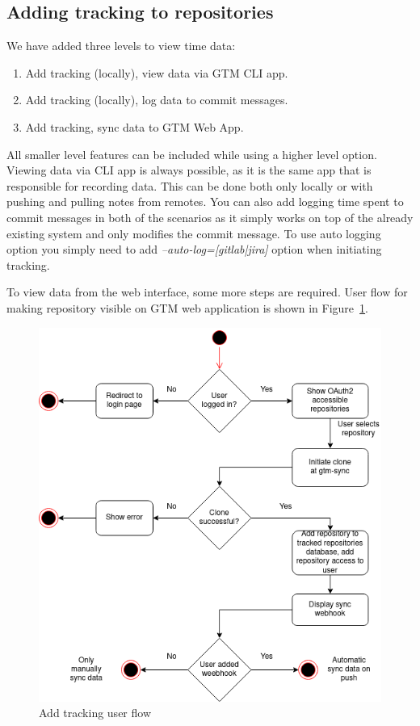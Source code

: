 \subsection{Adding tracking to repositories}\label{subsec:adding-tracking}
We have added three levels to view time data:
\begin{enumerate}
    \item Add tracking (locally), view data via GTM CLI app.
    \item Add tracking (locally), log data to commit messages.
    \item Add tracking, sync data to GTM Web App.
\end{enumerate}

All smaller level features can be included while using a higher level option.
Viewing data via CLI app is always possible, as it is the same app that is responsible for recording data.
This can be done both only locally or with pushing and pulling notes from remotes.
You can also add logging time spent to commit messages in both of the scenarios as it simply works on top of the already
existing system and only modifies the commit message.
To use auto logging option you simply need to add \textit{--auto-log=[gitlab|jira]} option when initiating tracking. %

To view data from the web interface, some more steps are required.
User flow for making repository visible on GTM web application is shown in Figure~\ref{fig:add-tracking-user-flow}.

\begin{figure}[h]
    \includegraphics[width=\textwidth]{figures/add_repo_user_flow}
    \caption{Add tracking user flow}
    \label{fig:add-tracking-user-flow}
\end{figure}

